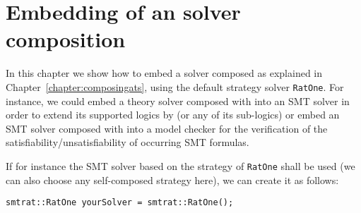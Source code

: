 \section{Embedding of an \smtrat solver composition}
\label{chapter:embedding}
In this chapter we show how to embed a solver composed as explained
in Chapter~\ref{chapter:composingats}, \eg using the default strategy
solver \texttt{RatOne}. For instance, we could embed a theory solver composed with \smtrat 
into an SMT solver in order to extend its supported logics by \supportedLogics (or any of its sub-logics) 
or embed an SMT solver composed with \smtrat into a model checker for the verification of the 
satisfiability/unsatisfiability of occurring SMT formulas. 

If for instance the SMT solver based on the strategy of \texttt{RatOne} shall be used (we can also choose any self-composed strategy here), we can create it as follows:
\begin{verbatim}
smtrat::RatOne yourSolver = smtrat::RatOne();
\end{verbatim}

